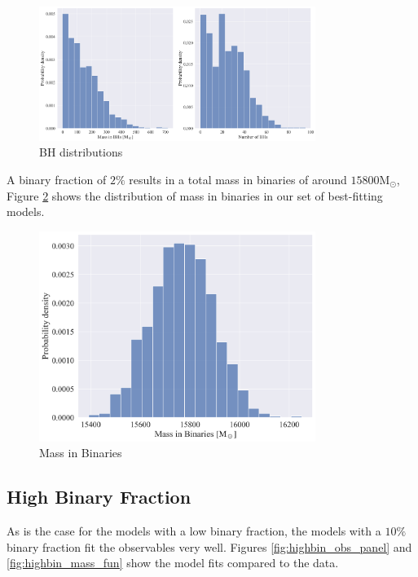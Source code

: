 \begin{figure}
	\centering
	\includegraphics[width=0.8\textwidth]{figures/low_bin_model/BH_dists.png}
	\caption{BH distributions}
	\label{fig:low_bin_model_BH_dists}
\end{figure}


A binary fraction of $2\%$ results in a total mass in binaries of around $15800 \mathrm{M}_\odot$,
Figure \ref{fig:low_bin_model_Bin_mass} shows the distribution of mass in binaries in our set of
best-fitting models.


\begin{figure}
	\centering
	\includegraphics[width=0.8\textwidth]{figures/low_bin_model/binary_mass.png}
	\caption{Mass in Binaries}
	\label{fig:low_bin_model_Bin_mass}
\end{figure}


\subsection{High Binary Fraction}

As is the case for the models with a low binary fraction, the models with a $10\%$ binary
fraction fit the observables very well. Figures \ref{fig:highbin_obs_panel} and
\ref{fig:highbin_mass_fun} show the model fits compared to the data.

